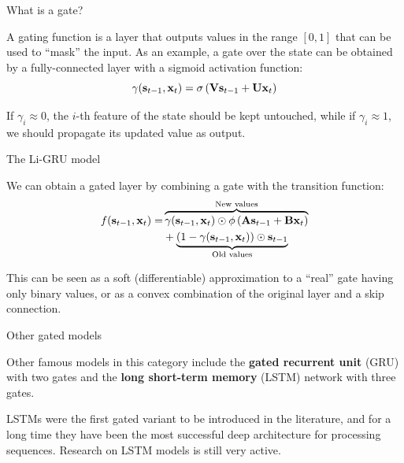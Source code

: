 \documentclass[11pt,aspectratio=169]{beamer}
\begin{document}
\begin{frame}{What is a gate?}
    \setlength{\parskip}{6pt}

    A gating function is a layer that outputs values in the range $[0,1]$
    that can be used to ``mask'' the input. As an example, a gate over the
    state can be obtained by a fully-connected layer with a sigmoid activation
    function:
    \[
        \gamma(\boldsymbol{\mathbf{s}}_{t-1},\boldsymbol{\mathbf{x}}_t)=\sigma\left(\boldsymbol{\mathbf{V}}\boldsymbol{\mathbf{s}}_{t-1}+\boldsymbol{\mathbf{U}}\boldsymbol{\mathbf{x}}_t\right)
    \]

    If $\gamma_i\approx 0$, the $i$-th feature of the state should be kept
    untouched, while if $\gamma_i\approx 1$, we should propagate its updated
    value as output.

\end{frame}

\begin{frame}{The Li-GRU model}
    \setlength{\parskip}{6pt}

    We can obtain a gated layer by combining a gate with the transition
    function:
    \begin{align*}
        f(\boldsymbol{\mathbf{s}}_{t-1},\boldsymbol{\mathbf{x}}_t)= & \overbrace{\gamma(\boldsymbol{\mathbf{s}}_{t-1},\boldsymbol{\mathbf{x}}_t)\odot\phi\left(\boldsymbol{\mathbf{A}}\boldsymbol{\mathbf{s}}_{t-1}+\boldsymbol{\mathbf{B}}\boldsymbol{\mathbf{x}}_t\right)}^{\text{New values}} \\
                                  & +\underbrace{(1-\gamma(\boldsymbol{\mathbf{s}}_{t-1},\boldsymbol{\mathbf{x}}_t))\odot\boldsymbol{\mathbf{s}}_{t-1}}_{\text{Old values}}
    \end{align*}

    This can be seen as a soft (differentiable) approximation to a ``real''
    gate having only binary values, or as a convex combination of the original
    layer and a skip connection.

\end{frame}

\begin{frame}{Other gated models}
    \setlength{\parskip}{6pt}

    Other famous models in this category include the \textbf{gated recurrent
    unit} (GRU) with two gates and the \textbf{long short-term memory} (LSTM)
    network with three gates.

    LSTMs were the first gated variant to be introduced in the literature, and
    for a long time they have been the most successful deep architecture for
    processing sequences. Research on LSTM models is still very active.


\end{frame}
\end{document}

